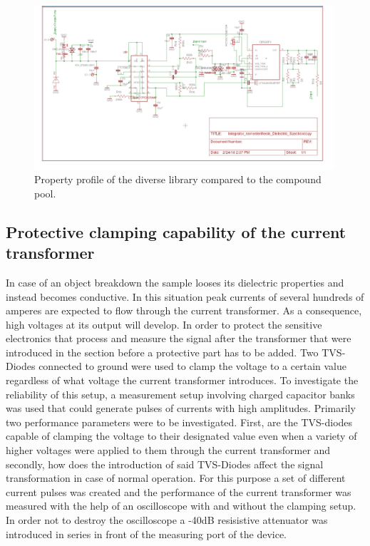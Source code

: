 \begin{figure}
\includegraphics[width=0.99\textwidth]{figures/Method/integrator/schematic.jpg}
 \caption{Property profile of the diverse library compared to the compound pool.}
 \end{figure}	

	



\subsection{Protective clamping capability of the current transformer}
\label{clamping}

In case of an object breakdown the sample looses its dielectric properties and instead becomes conductive.
In this situation peak currents of several hundreds of amperes are expected to flow through the current transformer.
As a consequence, high voltages at its output will develop. In order to protect the sensitive electronics that
process and measure the signal after the transformer that were introduced in the section before a protective part has to be added.
Two TVS-Diodes connected to ground were used to clamp the voltage to a certain value regardless of what voltage the current transformer introduces.
To investigate the reliability of this setup, a measurement setup involving charged capacitor banks was used that could generate
pulses of currents with high amplitudes. 
Primarily two performance parameters were to be investigated. First, are the TVS-diodes capable of clamping the voltage to their designated value even when
a variety of higher voltages were applied to them through the current transformer and secondly, how does the introduction of said TVS-Diodes affect the
signal transformation in case of normal operation. 
\newline
For this purpose a set of different current pulses was created and the performance of the current transformer was measured with the help of an
oscilloscope with and without the clamping setup. In order not to destroy the oscilloscope a -40dB resisistive attenuator was introduced in series in front of
the measuring port of the device.


